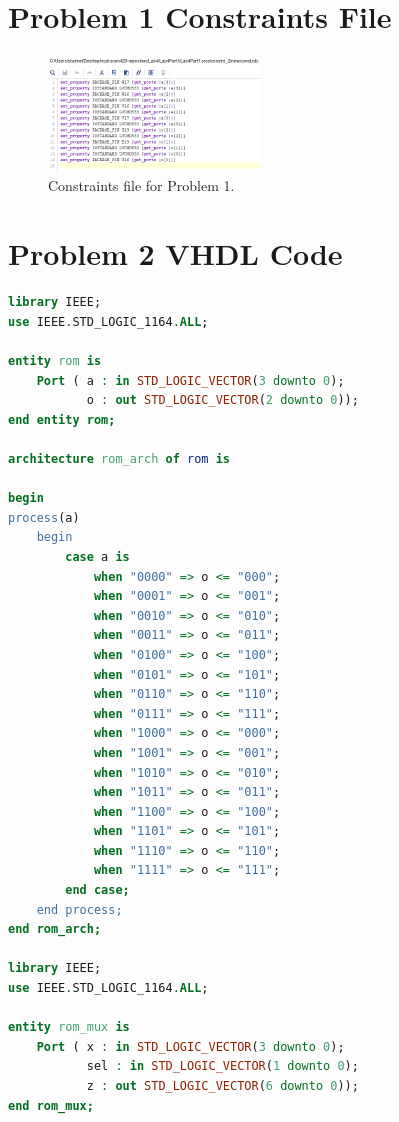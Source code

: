 \documentclass[11pt]{article}
\begin{document}
\begin{appendices}
\section{Problem 1 Constraints File}
\begin{figure}[H]
\begin{center}
	\includegraphics[width=0.5\textwidth]{../report-images/Part1Const.png}
	\caption{\label{fig:Part1ConstFile}Constraints file for Problem 1.}
\end{center}
\end{figure}

\section{Problem 2 VHDL Code}
\begin{lstlisting}[language=VHDL]
library IEEE;
use IEEE.STD_LOGIC_1164.ALL;

entity rom is
    Port ( a : in STD_LOGIC_VECTOR(3 downto 0);
           o : out STD_LOGIC_VECTOR(2 downto 0));
end entity rom;

architecture rom_arch of rom is
    
begin
process(a)
    begin
        case a is
            when "0000" => o <= "000";
            when "0001" => o <= "001";
            when "0010" => o <= "010";
            when "0011" => o <= "011";
            when "0100" => o <= "100";
            when "0101" => o <= "101";
            when "0110" => o <= "110";
            when "0111" => o <= "111";
            when "1000" => o <= "000";
            when "1001" => o <= "001";
            when "1010" => o <= "010";
            when "1011" => o <= "011";
            when "1100" => o <= "100";
            when "1101" => o <= "101";
            when "1110" => o <= "110";
            when "1111" => o <= "111";
        end case;
    end process;
end rom_arch;

library IEEE;
use IEEE.STD_LOGIC_1164.ALL;

entity rom_mux is
    Port ( x : in STD_LOGIC_VECTOR(3 downto 0);
           sel : in STD_LOGIC_VECTOR(1 downto 0);
           z : out STD_LOGIC_VECTOR(6 downto 0));
end rom_mux;


\end{lstlisting}
\end{appendices}
\end{document}
